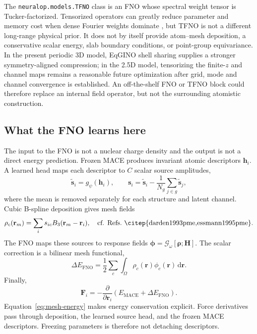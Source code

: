 \documentclass[11pt]{article}
\newcommand{\code}[1]{\texttt{#1}}
\begin{document}
The \code{neuralop.models.TFNO} class is an FNO whose spectral weight tensor
is Tucker-factorized. Tensorized operators can greatly reduce parameter and
memory cost when dense Fourier weights dominate \citep{kossaifi2024mgtfno},
but TFNO is not a different long-range physical prior. It does not by itself
provide atom--mesh deposition, a conservative scalar energy, slab boundary
conditions, or point-group equivariance. In the present periodic 3D model,
EqGINO shell sharing supplies a stronger symmetry-aligned compression; in the
2.5D model, tensorizing the finite-\(z\) and channel maps remains a reasonable
future optimization after grid, mode and channel convergence is established.
An off-the-shelf FNO or TFNO block could therefore replace an internal field
operator, but not the surrounding atomistic construction.


\subsection{What the FNO learns here}

The input to the FNO is not a nuclear charge density and the output is not a
direct energy prediction. Frozen MACE produces invariant atomic descriptors
\(\mathbf h_i\). A learned head maps each descriptor to \(C\) scalar source
amplitudes,
\begin{equation}
 \widetilde{\mathbf s}_i=g_\psi(\mathbf h_i),\qquad
 \mathbf s_i=\widetilde{\mathbf s}_i
 -\frac{1}{N_g}\sum_{j\in g}\widetilde{\mathbf s}_j ,
 \label{eq:neutral-source}
\end{equation}
where the mean is removed separately for each structure and latent channel.
Cubic B-spline deposition gives mesh fields
\begin{equation}
 \rho_c(\mathbf r_m)=\sum_i s_{ic}B_3(\mathbf r_m-\mathbf r_i),
 \quad\text{cf. Refs.~\citep{darden1993pme,essmann1995pme}.}
\end{equation}
The FNO maps these sources to response fields
\(\boldsymbol\phi=\mathcal G_\omega[\boldsymbol\rho;\mathbf H]\). The scalar
correction is a bilinear mesh functional,
\begin{equation}
 \Delta E_{\mathrm{FNO}}
 =\frac{1}{2}\sum_c\int_\Omega
 \rho_c(\mathbf r)\phi_c(\mathbf r)\,\mathrm d\mathbf r .
 \label{eq:mesh-energy}
\end{equation}
Finally,
\begin{equation}
 \mathbf F_i=-\frac{\partial}{\partial\mathbf r_i}
 (E_{\mathrm{MACE}}+\Delta E_{\mathrm{FNO}}).
\end{equation}
Equation~\eqref{eq:mesh-energy} makes energy conservation explicit. Force
derivatives pass through deposition, the learned source head, and the frozen
MACE descriptors. Freezing parameters is therefore not detaching descriptors.
\end{document}
